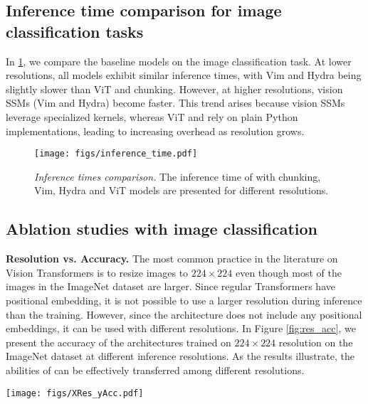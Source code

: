 \subsection{Inference time comparison for image classification tasks}
\label{subsec:inf_time}

In \cref{fig:inf_time}, we compare the baseline models on the image classification task. At lower resolutions, all models exhibit similar inference times, with Vim and Hydra being slightly slower than ViT and \lionretnet chunking. However, at higher resolutions, vision SSMs (Vim and Hydra) become faster. This trend arises because vision SSMs leverage specialized kernels, whereas ViT and \lionretnet rely on plain Python implementations, leading to increasing overhead as resolution grows.

\begin{figure}[t] 
    \centering
    \texttt{[image: figs/inference\_time.pdf]}
    \vspace{-1mm}
  \caption{ \textit{Inference times comparison.} The inference time of \lionretnet with chunking, Vim, Hydra and ViT models are presented for different resolutions.
   }
  \label{fig:inf_time}
\end{figure}

\subsection{Ablation studies with image classification}
\label{subsec:image_ablation}

\textbf{Resolution vs. Accuracy.} The most common practice in the literature on Vision Transformers is to resize images to $224\times224$ even though most of the images in the ImageNet dataset are larger. Since regular Transformers have positional embedding, it is not possible to use a larger resolution during inference than the training. However, since the \lions architecture does not include any positional embeddings, it can be used with different resolutions. In Figure \ref{fig:res_acc}, we present the accuracy of the architectures trained on $224\times224$ resolution on the ImageNet dataset at different inference resolutions. As the results illustrate, the abilities of \lions can be effectively transferred among different resolutions.


\begin{figure*}[!b]
    \vspace{-3mm}
    \centering
    \texttt{[image: figs/XRes\_yAcc.pdf]}
  \caption{\textit{Top-1 accuracy on Imagenet of the models at different resolutions.} Images are resized at the corresponding resolution and fed into the model. Due to positional embeddings, ViT and \lionlit models cannot perform with sizes larger than the training size while \lions can preserve the accuracy for much higher resolutions. }
    \label{fig:res_acc}
    \vspace{-3mm}
    
\end{figure*}


